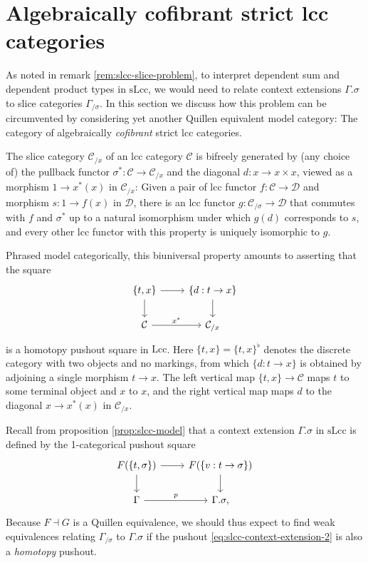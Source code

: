 \documentclass[a4paper]{article}
\theoremstyle{remark}
\theoremstyle{definition}
\begin{document}
\section{Algebraically cofibrant strict lcc categories}
\label{sec:algebraically-cofibrant}

As noted in remark \ref{rem:slcc-slice-problem}, to interpret dependent sum and dependent product types in $\mathrm{sLcc}$, we would need to relate context extensions $\Gamma.\sigma$ to slice categories $\Gamma_{/ \sigma}$.
In this section we discuss how this problem can be circumvented by considering yet another Quillen equivalent model category: The category of algebraically \emph{cofibrant} strict lcc categories.

The slice category $\mathcal{C}_{/ x}$ of an lcc category $\mathcal{C}$ is bifreely generated by (any choice of) the pullback functor $\sigma^* : \mathcal{C} \rightarrow \mathcal{C}_{/ x}$ and the diagonal $d : x \rightarrow x \times x$, viewed as a morphism $1 \rightarrow x^*(x)$ in $\mathcal{C}_{/ x}$:
Given a pair of lcc functor $f : \mathcal{C} \rightarrow \mathcal{D}$ and morphism $s : 1 \rightarrow f(x)$ in $\mathcal{D}$, there is an lcc functor $g : \mathcal{C}_{/ \sigma} \rightarrow \mathcal{D}$ that commutes with $f$ and $\sigma^*$ up to a natural isomorphism under which $g(d)$ corresponds to $s$, and every other lcc functor with this property is uniquely isomorphic to $g$.

Phrased model categorically, this biuniversal property amounts to asserting that the square
\begin{equation}
  \label{eq:homotopy-pushout-lcc}
  \begin{tikzcd}
    \{ t, x \} \arrow[r] \arrow[d] & \{ d : t \rightarrow x \} \arrow[d] \\
    \mathcal{C} \arrow[r, "x^*"] & \mathcal{C}_{/ x}
  \end{tikzcd}
\end{equation}
is a homotopy pushout square in $\mathrm{Lcc}$.
Here $\{t, x\} = \{t, x\}^\flat$ denotes the discrete category with two objects and no markings, from which $\{d : t \rightarrow x\}$ is obtained by adjoining a single morphism $t \rightarrow x$.
The left vertical map $\{ t, x \} \rightarrow \mathcal{C}$ maps $t$ to some terminal object and $x$ to $x$, and the right vertical map maps $d$ to the diagonal $x \rightarrow x^*(x)$ in $\mathcal{C}_{/ x}$.

Recall from proposition \ref{prop:slcc-model} that a context extension $\Gamma.\sigma$ in $\mathrm{sLcc}$ is defined by the 1-categorical pushout square
\begin{equation}
  \label{eq:slcc-context-extension-2}
  \begin{tikzcd}
    F(\{ t, \sigma \}) \arrow[d] \arrow[r] & F(\{ v : t \rightarrow \sigma \}) \arrow[d] \\
    \Gamma \arrow[r, "p"] & \Gamma.\sigma,
  \end{tikzcd}
\end{equation}
Because $F \dashv G$ is a Quillen equivalence, we should thus expect to find weak equivalences relating $\Gamma_{/ \sigma}$ to $\Gamma.\sigma$ if the pushout \eqref{eq:slcc-context-extension-2} is also a \emph{homotopy} pushout.
\end{document}
